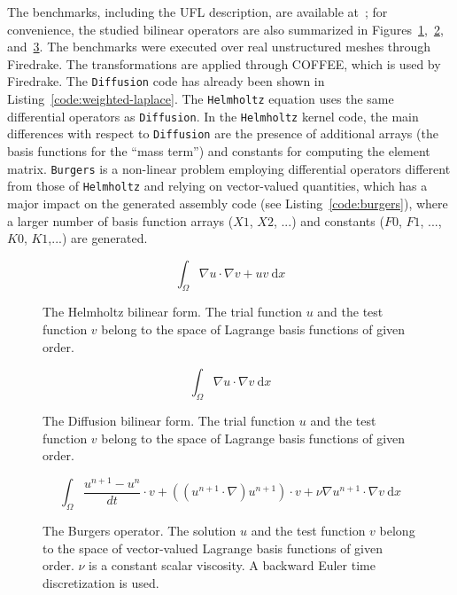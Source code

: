 The benchmarks, including the UFL description, are available at~\citep{ufl-code-lowlevelopt}; for convenience, the studied bilinear operators are also summarized in Figures~\ref{eq:lowlevel-helmholtz},~\ref{eq:lowlevel-diffusion}, and~\ref{eq:lowlevel-burgers}. The benchmarks were executed over real unstructured meshes through Firedrake. The transformations are applied through COFFEE, which is used by Firedrake. The {\tt Diffusion} code has already been shown in Listing~\ref{code:weighted-laplace}. The {\tt Helmholtz} equation uses the same differential operators as {\tt Diffusion}. In the {\tt Helmholtz} kernel code, the main differences with respect to {\tt Diffusion} are the presence of additional arrays (the basis functions for the ``mass term'') and constants for computing the element matrix. {\tt Burgers} is a non-linear problem employing differential operators different from those of {\tt Helmholtz} and relying on vector-valued quantities, which has a major impact on the generated assembly code (see Listing~\ref{code:burgers}), where a larger number of basis function arrays ($X1$, $X2$, ...) and constants ($F0$, $F1$, ..., $K0$, $K1$,...) are generated.

\begin{figure}
\begin{equation}
\int_\Omega \nabla u\cdot\nabla v  + uv\ \mathrm{d}x
\end{equation}
\caption{The Helmholtz bilinear form. The trial function $u$ and the test function $v$ belong to the space of Lagrange basis functions of given order.}
\label{eq:lowlevel-helmholtz}
\end{figure}

\begin{figure}
\begin{equation}
\int_\Omega \nabla u\cdot\nabla v\ \mathrm{d}x
\end{equation}
\caption{The Diffusion bilinear form. The trial function $u$ and the test function $v$ belong to the space of Lagrange basis functions of given order.}
\label{eq:lowlevel-diffusion}
\end{figure}

\begin{figure}
\begin{equation}
\int_\Omega\frac{u^{n+1}-u^n}{dt}\cdot v + ((u^{n+1}\cdot\nabla) u^{n+1})\cdot v + \nu\nabla u^{n+1}\cdot\nabla v \ \mathrm d x
\end{equation}
\caption{The Burgers operator. The solution $u$ and the test function $v$ belong to the space of vector-valued Lagrange basis functions of given order. $\nu$ is a constant scalar viscosity. A backward Euler time discretization is used.}
\label{eq:lowlevel-burgers}
\end{figure}

